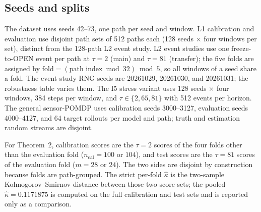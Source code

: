 \subsection{Seeds and splits}\label{app:c4}

The dataset uses seeds 42--73, one path per seed and window. L1
calibration and evaluation use disjoint path sets of 512 paths each
(128 seeds $\times$ four windows per set), distinct from the 128-path L2
event study. L2 event studies use one
freeze-to-OPEN event per path at $\tau=2$ (main) and $\tau=81$
(transfer); the five folds are assigned by
$\text{fold}=(\text{path index}\bmod 32)\bmod 5$, so all windows of a
seed share a fold. The event-study RNG seeds are 20261029, 20261030, and
20261031; the robustness table varies them. The I5 stress variant uses
128 seeds $\times$ four windows, 384 steps per window, and
$\tau\in\{2,65,81\}$ with 512 events per horizon. The general sensor-POMDP
uses calibration seeds 3000--3127, evaluation seeds 4000--4127, and 64 target
rollouts per model and path; truth and estimation random streams are disjoint.

For Theorem~2, calibration scores are the $\tau=2$ scores of the four
folds other than the evaluation fold ($n_{\mathrm{cal}}=100$ or $104$),
and test scores are the $\tau=81$ scores of the evaluation fold
($m=28$ or $24$). The two sides are disjoint by construction because
folds are path-grouped. The strict per-fold $\hat\kappa$ is the
two-sample Kolmogorov--Smirnov distance between those two score sets;
the pooled $\hat\kappa=0.1171875$ is computed on the full calibration
and test sets and is reported only as a comparison.
